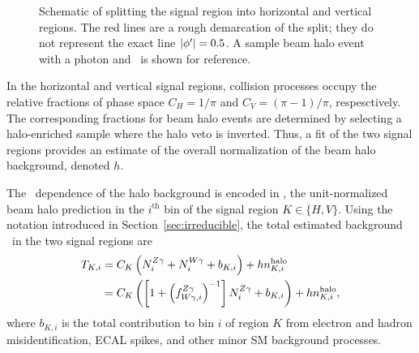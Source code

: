 \begin{figure}[htbp]
  \centering
  \caption{
        Schematic of splitting the signal region into horizontal and vertical regions.
        The red lines are a rough demarcation of the split; they do not represent the exact line $\abs{\phi'} = 0.5$.
        A sample beam halo event with a photon and \met\ is shown for reference.
      }
    \label{fig:split_diagram}
\end{figure}

In the horizontal and vertical signal regions, collision processes occupy the relative fractions of phase space $C_{H} = 1/\pi$ and $C_{V} = (\pi-1)/\pi$, respesctively. 
The corresponding fractions for beam halo events are determined by selecting a halo-enriched sample where the halo veto is inverted. 
Thus, a fit of the two signal regions provides an estimate of the overall normalization of the beam halo background, denoted $h$.
 
The \ETg\ dependence of the halo background is encoded in \nhalo[,i], the unit-normalized beam halo prediction in the $i^\mathrm{th}$ bin of the signal region $K \in \{H,V\}$.
Using the notation introduced in Section~\ref{sec:irreducible}, the total estimated background \TK\ in the two signal regions are
\begin{equation}
\begin{aligned}
  \TK[,i] & = C_{K} \left( \NZg[i] + \NWg[i] + b_{K,i}\right) + h \nhalo[,i]  \\
          & = C_{K} \left( \left[1 + \left(\fZW[,i]\right)^{-1}\right] \NZg[i] + b_{K,i}\right) + h \nhalo[,i],
\end{aligned}
\end{equation}
where $b_{K,i}$ is the total contribution to bin $i$ of region $K$ from electron and hadron misidentification, ECAL spikes, and other minor SM background processes.

